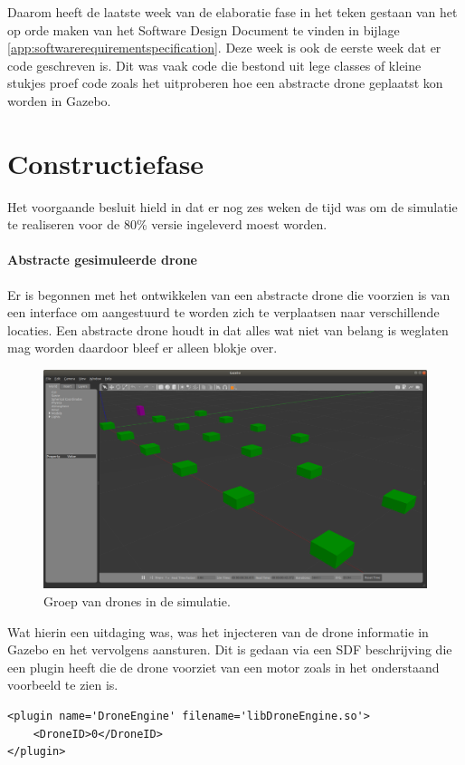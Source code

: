 \documentclass[a4paper, 11pt, oneside]{report}
\begin{document}
Daarom heeft de laatste week van de elaboratie fase in het teken gestaan van het op orde maken van het Software Design Document te vinden in bijlage  \ref{app:softwarerequirementspecification}.
Deze week is ook de eerste week dat er code geschreven is. 
Dit was vaak code die bestond uit lege classes of kleine stukjes proef code zoals het uitproberen hoe een abstracte drone geplaatst kon worden in Gazebo.

\section{Constructiefase}\label{sec:constructiefase}
Het voorgaande besluit hield in dat er nog zes weken de tijd was om de simulatie te realiseren voor de 80\% versie ingeleverd moest worden.
\paragraph{Abstracte gesimuleerde drone}
Er is begonnen met het ontwikkelen van een abstracte drone die voorzien is van een interface  om aangestuurd te worden zich te verplaatsen naar verschillende locaties.
Een abstracte drone houdt in dat alles wat niet van belang is weglaten mag worden daardoor bleef er alleen blokje over.
\begin{figure}[H]
	\begin{center}\includegraphics[width=.6\linewidth]{Afbeeldingen/dronegroep.png}\end{center}
	\caption{Groep van drones in de simulatie.}
	\label{fig:dronegroep}
\end{figure}

Wat hierin een uitdaging was, was het injecteren van de drone informatie in Gazebo en het vervolgens aansturen. Dit is gedaan via een SDF beschrijving \cite{sdf} die een plugin heeft die de drone voorziet van een motor zoals in het onderstaand voorbeeld te zien is. 

\begin{lstlisting}
<plugin name='DroneEngine' filename='libDroneEngine.so'>
	<DroneID>0</DroneID>
</plugin>
\end{lstlisting}
\end{document}
